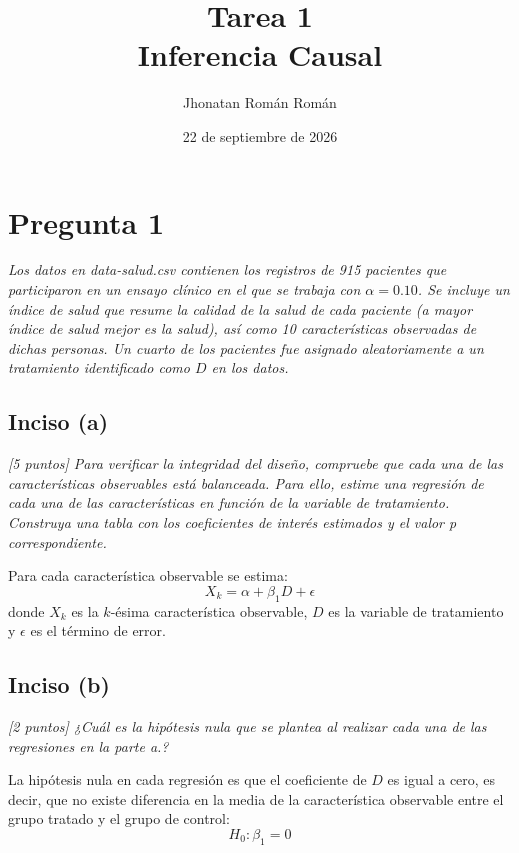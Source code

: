\documentclass[12pt]{article}
\title{Tarea 1 \\ \large Inferencia Causal}
\author{Jhonatan Román Román}
\date{22 de septiembre de 2026}
\begin{document}
\maketitle

\section{Pregunta 1}

\textit{Los datos en data-salud.csv contienen los registros de 915 pacientes que participaron en un ensayo clínico en el que se trabaja con $\alpha = 0.10$. Se incluye un índice de salud que resume la calidad de la salud de cada paciente (a mayor índice de salud mejor es la salud), así como 10 características observadas de dichas personas. Un cuarto de los pacientes fue asignado aleatoriamente a un tratamiento identificado como $D$ en los datos.}

\subsection*{Inciso (a)}

\textit{[5 puntos] Para verificar la integridad del diseño, compruebe que cada una de las características observables está balanceada. Para ello, estime una regresión de cada una de las características en función de la variable de tratamiento. Construya una tabla con los coeficientes de interés estimados y el valor p correspondiente.}

Para cada característica observable se estima:
\begin{equation}
X_k = \alpha + \beta_1 D + \epsilon
\end{equation}
donde $X_k$ es la $k$-ésima característica observable, $D$ es la variable de tratamiento y $\epsilon$ es el término de error.




\subsection*{Inciso (b)}

\textit{[2 puntos] ¿Cuál es la hipótesis nula que se plantea al realizar cada una de las regresiones en la parte a.?}

La hipótesis nula en cada regresión es que el coeficiente de $D$ es igual a cero, es decir, que no existe diferencia en la media de la característica observable entre el grupo tratado y el grupo de control:
\[
H_0: \beta_1 = 0
\]
\end{document}
